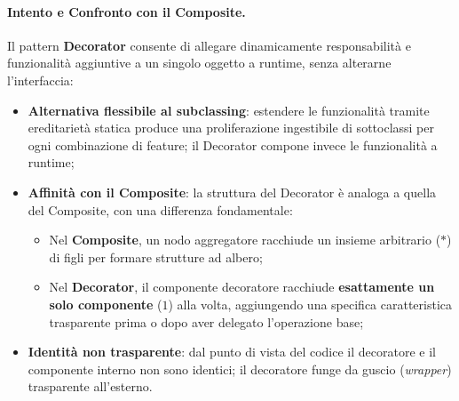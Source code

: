 \documentclass[12pt]{extarticle}
\begin{document}
\paragraph{Intento e Confronto con il Composite.}
Il pattern \textbf{Decorator} consente di allegare dinamicamente responsabilità e funzionalità aggiuntive a un singolo oggetto a runtime, senza alterarne l'interfaccia:
\begin{itemize}
    \item \textbf{Alternativa flessibile al subclassing}: estendere le funzionalità tramite ereditarietà statica produce una proliferazione ingestibile di sottoclassi per ogni combinazione di feature; il Decorator compone invece le funzionalità a runtime;
    \item \textbf{Affinità con il Composite}: la struttura del Decorator è analoga a quella del Composite, con una differenza fondamentale:
    \begin{itemize}
        \item Nel \textbf{Composite}, un nodo aggregatore racchiude un insieme arbitrario ($*$) di figli per formare strutture ad albero;
        \item Nel \textbf{Decorator}, il componente decoratore racchiude \textbf{esattamente un solo componente} ($1$) alla volta, aggiungendo una specifica caratteristica trasparente prima o dopo aver delegato l'operazione base;
    \end{itemize}
    \item \textbf{Identità non trasparente}: dal punto di vista del codice il decoratore e il componente interno non sono identici; il decoratore funge da guscio (\textit{wrapper}) trasparente all'esterno.
\end{itemize}
\end{document}
